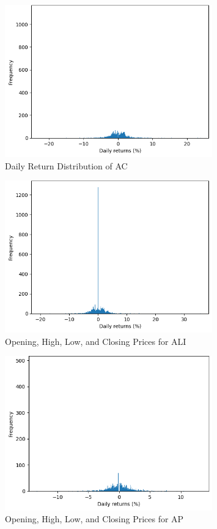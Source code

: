 \begin{figure}[ht]
    \centering
    \includegraphics[width=0.80\textwidth]{./assets/Appendices/B/Distribution_DailyReturns/AC.png}
    \caption{Daily Return Distribution of AC}
    \label{fig:returndist_AC}
\end{figure}
\FloatBarrier
    
\begin{figure}[ht]
    \centering
    \includegraphics[width=0.80\textwidth]{./assets/Appendices/B/Distribution_DailyReturns/ALI.png}
    \caption{Opening, High, Low, and Closing Prices for ALI}
    \label{fig:returndist_ALI}
\end{figure}
\FloatBarrier

\begin{figure}[ht]
    \centering
    \includegraphics[width=0.80\textwidth]{./assets/Appendices/B/Distribution_DailyReturns/AP.png}
    \caption{Opening, High, Low, and Closing Prices for AP}
    \label{fig:returndist_AP}
\end{figure}
\FloatBarrier

